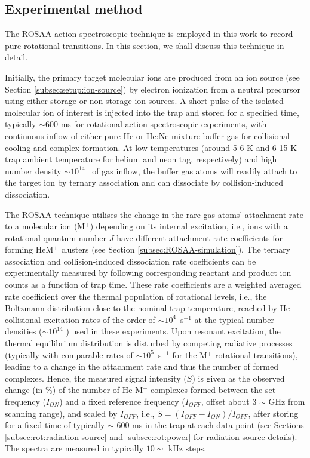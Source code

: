 \subsection{Experimental method}
\label{subsec:ROSAA}

The ROSAA action spectroscopic technique is employed in this work to record pure rotational transitions. In this section, we shall discuss this technique in detail.

Initially, the primary target molecular ions are produced from an ion source (see Section \ref{subsec:setup:ion-source}) by electron ionization from a neutral precursor using either storage or non-storage ion sources. A short pulse of the isolated molecular ion of interest is injected into the trap and stored for a specified time, typically $\sim 600$ ms for rotational action spectroscopic experiments, with continuous inflow of either pure He or He:Ne mixture buffer gas for collisional cooling and complex formation. At low temperatures (around 5-6 K and 6-15 K trap ambient temperature for helium and neon tag, respectively) and high number density $\sim10^{14}$ \percc\ of gas inflow, the buffer gas atoms will readily attach to the target ion by ternary association and can dissociate by collision-induced dissociation.

The ROSAA technique utilises the change in the rare gas atoms' attachment rate to a molecular ion (M$^+$) depending on its internal excitation, i.e., ions with a rotational quantum number $J$ have different attachment rate coefficients for forming HeM$^+$ clusters (see Section \ref{subsec:ROSAA-simulation}). The ternary association and collision-induced dissociation rate coefficients can be experimentally measured by following corresponding reactant and product ion counts as a function of trap time. These rate coefficients are a weighted averaged rate coefficient over the thermal population of rotational levels, i.e., the Boltzmann distribution close to the nominal trap temperature, reached by He collisional excitation rates of the order of $\sim 10^4$~s$^{-1}$ at the typical number densities ($\sim 10^{14}$ \percc) used in these experiments. Upon resonant excitation, the thermal equilibrium distribution is disturbed by competing radiative processes (typically with comparable rates of $\sim 10^5$~s$^{-1}$ for the M$^+$ rotational transitions), leading to a change in the attachment rate and thus the number of formed complexes. Hence, the measured signal intensity ($S$) is given as the observed change (in \%) of the number of He-M$^+$ complexes formed between the set frequency ($I_{ON}$) and a fixed reference frequency ($I_{OFF}$, offset about 3 $\sim$ GHz from scanning range), and scaled by $I_{OFF}$, i.e., $ S=(I_{OFF} - I_{ON})/I_{OFF} $, after storing for a fixed time of typically $\sim$ 600 ms in the trap at each data point (see Sections \ref{subsec:rot:radiation-source} and \ref{subsec:rot:power} for radiation source details). The spectra are measured in typically $10\sim$ kHz steps.
